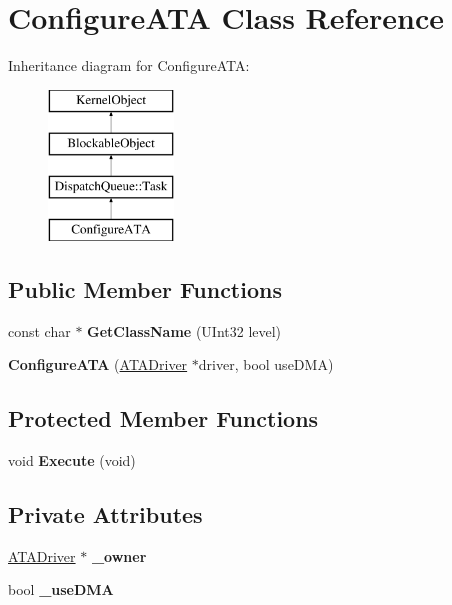 \hypertarget{class_configure_a_t_a}{}\section{Configure\+A\+TA Class Reference}
\label{class_configure_a_t_a}
Inheritance diagram for Configure\+A\+TA\+:\begin{figure}[H]
\begin{center}
\leavevmode
\includegraphics[height=4.000000cm]{class_configure_a_t_a}
\end{center}
\end{figure}
\subsection*{Public Member Functions}
\begin{DoxyCompactItemize}
\item 
\mbox{\label{class_configure_a_t_a_a6adf1b2ad320729ae84f851adbbf4c09}} 
const char $\ast$ {\bfseries Get\+Class\+Name} (U\+Int32 level)
\item 
\mbox{\label{class_configure_a_t_a_ae6f2afeaabb8b4edf19ce009f8e61c59}} 
{\bfseries Configure\+A\+TA} (\hyperlink{class_a_t_a_driver}{A\+T\+A\+Driver} $\ast$driver, bool use\+D\+MA)
\end{DoxyCompactItemize}
\subsection*{Protected Member Functions}
\begin{DoxyCompactItemize}
\item 
\mbox{\label{class_configure_a_t_a_a40c16425cfde67d09deb7a7fa06ebee2}} 
void {\bfseries Execute} (void)
\end{DoxyCompactItemize}
\subsection*{Private Attributes}
\begin{DoxyCompactItemize}
\item 
\mbox{\label{class_configure_a_t_a_a466e12e38b33d00f97b5c485ce54ab57}} 
\hyperlink{class_a_t_a_driver}{A\+T\+A\+Driver} $\ast$ {\bfseries \+\_\+owner}
\item 
\mbox{\label{class_configure_a_t_a_ad6faca95744b0d5a47a4df5ceef4f5a7}} 
bool {\bfseries \+\_\+use\+D\+MA}
\end{DoxyCompactItemize}
